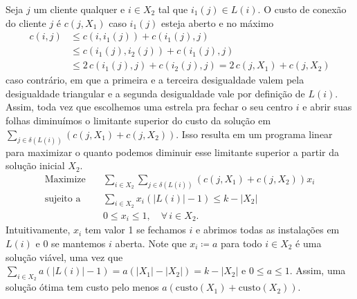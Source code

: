 Seja $j$ um cliente qualquer e $i \in X_2$ tal que $i_1(j) \in L(i)$. O custo de conexão do cliente $j$ é $c(j,X_1)$ caso $i_1(j)$ esteja aberto e no máximo 
\begin{align}
    c(i,j) &\leq c(i,i_1(j)) + c(i_1(j),j) \nonumber \\
    &\leq c(i_1(j),i_2(j)) +  c(i_1(j),j) \nonumber \\
    &\leq 2\,c(i_1(j),j) + c(i_2(j),j) = 2\,c(j,X_1) + c(j,X_2)\nonumber
\end{align}
caso contrário, em que a primeira e a terceira desigualdade valem pela desigualdade triangular e a segunda desigualdade vale por definição de $L(i)$. Assim, toda vez que escolhemos uma estrela pra fechar o seu centro $i$  e abrir suas folhas diminuímos o limitante superior do custo da solução em $\sum_{j \in \delta(L(i))}(c(j,X_1) + c(j,X_2))$. Isso resulta em um programa linear para maximizar o quanto podemos diminuir esse limitante superior a partir da solução inicial $X_2$.
\begin{align}
\text{Maximize} \quad &\sum_{i \in X_2} \sum_{j\in \delta(L(i))} (c(j,X_1) + c(j,X_2))x_i \nonumber\\
\text{sujeito a}\quad & \sum_{i \in X_2} x_i(|L(i)| - 1) \leq k - |X_2| \nonumber \\
&0 \leq x_i \leq 1, \quad \forall\, i \in X_2 \nonumber.
\end{align}
Intuitivamente, $x_i$ tem valor 1 se fechamos $i$ e abrimos todas as instalações em $L(i)$ e 0 se mantemos $i$ aberta. Note que $x_i \coloneqq a$ para todo $i \in X_2$ é uma solução viável, uma vez que $\sum_{i \in X_2} a(|L(i)| - 1) = a(|X_1| - |X_2|) = k - |X_2|$ e $ 0 \leq a \leq 1$. Assim, uma solução ótima tem custo pelo menos $a(\text{custo}(X_1) + \text{custo}(X_2))$.

